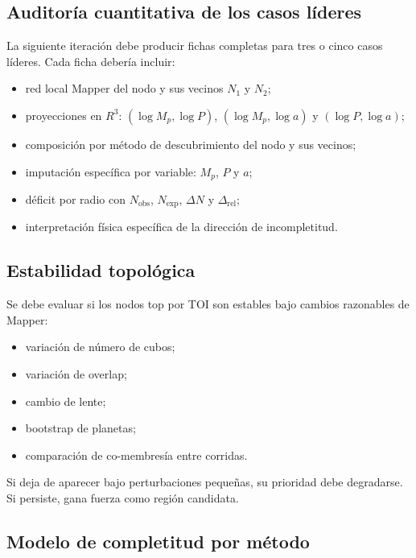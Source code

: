 \documentclass[11pt]{article}
\newcommand{\code}[1]{\texttt{\detokenize{#1}}}
\begin{document}
\subsection{Auditoría cuantitativa de los casos líderes}

La siguiente iteración debe producir fichas completas para tres o cinco casos líderes. Cada ficha debería incluir:

\begin{itemize}
    \item red local Mapper del nodo y sus vecinos $N_1$ y $N_2$;
    \item proyecciones en $R^3$: $(\log M_p,\log P)$, $(\log M_p,\log a)$ y $(\log P,\log a)$;
    \item composición por método de descubrimiento del nodo y sus vecinos;
    \item imputación específica por variable: $M_p$, $P$ y $a$;
    \item déficit por radio con $N_{\mathrm{obs}}$, $N_{\mathrm{exp}}$, $\Delta N$ y $\Delta_{\mathrm{rel}}$;
    \item interpretación física específica de la dirección de incompletitud.
\end{itemize}

\subsection{Estabilidad topológica}

Se debe evaluar si los nodos top por TOI son estables bajo cambios razonables de Mapper:

\begin{itemize}
    \item variación de número de cubos;
    \item variación de overlap;
    \item cambio de lente;
    \item bootstrap de planetas;
    \item comparación de co-membresía entre corridas.
\end{itemize}

Si \code{cube12_cluster0} deja de aparecer bajo perturbaciones pequeñas, su prioridad debe degradarse. Si persiste, gana fuerza como región candidata.

\subsection{Modelo de completitud por método}
\end{document}
